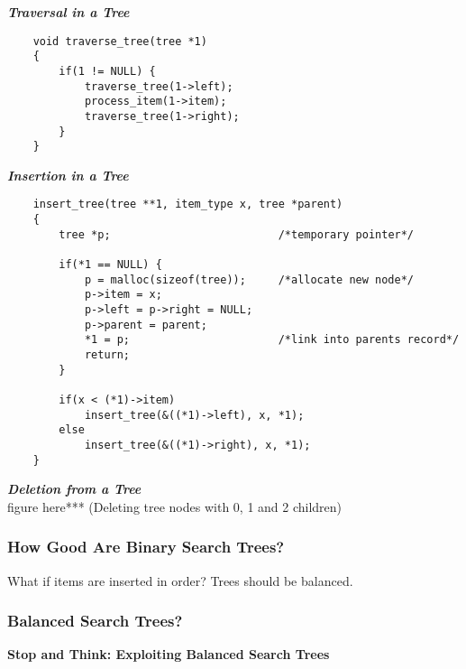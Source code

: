 \textbf{ \emph{Traversal in a Tree} }\\

\begin{verbatim}
    void traverse_tree(tree *1)
    {
        if(1 != NULL) {
            traverse_tree(1->left);
            process_item(1->item);
            traverse_tree(1->right);
        }
    }
\end{verbatim}

\textbf{ \emph{Insertion in a Tree} }\\

\begin{verbatim}
    insert_tree(tree **1, item_type x, tree *parent)
    {
        tree *p;                          /*temporary pointer*/

        if(*1 == NULL) {
            p = malloc(sizeof(tree));     /*allocate new node*/
            p->item = x;
            p->left = p->right = NULL;
            p->parent = parent;
            *1 = p;                       /*link into parents record*/
            return;
        }

        if(x < (*1)->item)
            insert_tree(&((*1)->left), x, *1);
        else
            insert_tree(&((*1)->right), x, *1);
    }
\end{verbatim}

\textbf{ \emph{Deletion from a Tree} }\\

figure here*** (Deleting tree nodes with 0, 1 and 2 children)\\

\subsubsection{How Good Are Binary Search Trees?}

What if items are inserted in order? Trees should be balanced. \\


\subsubsection{Balanced Search Trees?}

\noindent{}

\textbf{Stop and Think: Exploiting Balanced Search Trees} \\

